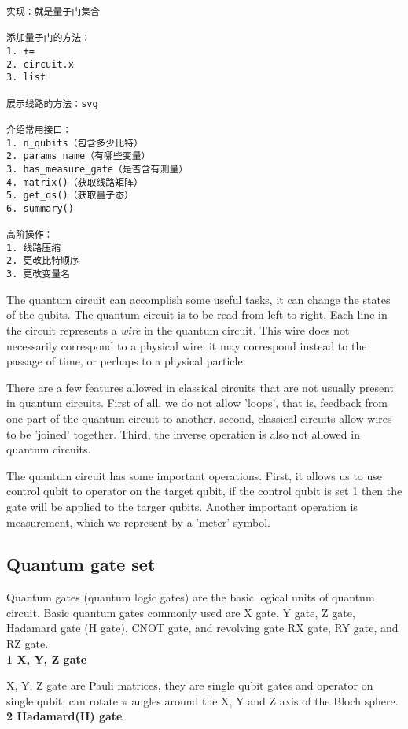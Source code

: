 \begin{lstlisting}
实现：就是量子门集合

添加量子门的方法：
1. +=
2. circuit.x
3. list

展示线路的方法：svg

介绍常用接口：
1. n_qubits（包含多少比特）
2. params_name（有哪些变量）
3. has_measure_gate（是否含有测量）
4. matrix()（获取线路矩阵）
5. get_qs()（获取量子态）
6. summary()

高阶操作：
1. 线路压缩
2. 更改比特顺序
3. 更改变量名
\end{lstlisting}

The quantum circuit can accomplish some useful tasks, it can change the states of the qubits. The quantum circuit is to be read from left-to-right. Each line in the circuit represents a \textit{wire} in the quantum circuit. This wire does not necessarily correspond to a physical wire; it may correspond instead to the passage of time, or perhaps to a physical particle. 

There are a few features allowed in classical circuits that are not usually present in quantum circuits. First of all, we do not allow 'loops', that is, feedback from one part of the quantum circuit to another. second, classical circuits allow wires to be 'joined' together. Third, the inverse operation is also not allowed in quantum circuits.

The quantum circuit has some important operations. First, it allows us to use control qubit to operator on the target qubit, if the control qubit is set 1 then the gate will be applied to the targer qubits. Another important operation is measurement, which we represent by a 'meter' symbol.  
 
\subsection{Quantum gate set}
Quantum gates (quantum logic gates) are the basic logical units of quantum circuit. Basic quantum gates commonly used are X gate, Y gate, Z gate, Hadamard gate (H gate), CNOT gate, and revolving gate RX gate, RY gate, and RZ gate. \\

\textbf{1 X, Y, Z gate}

X, Y, Z gate are Pauli matrices, they are single qubit gates and operator on single qubit, can rotate $\pi$ angles around the X, Y and Z axis of the Bloch sphere.   \\

\textbf{2 Hadamard(H) gate}

